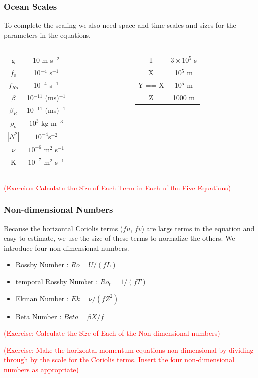 \documentclass[xcolor=dvipsnames]{beamer}
\begin{document}
\begin{frame}
\frametitle{Ocean Scales}

To complete the scaling we also need space and time scales and sizes for the parameters in the equations.\\ \vspace{0.2in}

\begin{columns}[c]
\column{2in}
\begin{tabular}{cc}
\hline
g & 10 m s$^{-2}$\\
$f_o$ & 10$^{-4}$ s$^{-1}$\\
$f_{Ro}$ & 10$^{-4}$ s$^{-1}$\\
$\beta$ &  10$^{-11}$ (ms)$^{-1}$\\
$\beta_R$ &  10$^{-11}$ (ms)$^{-1}$\\
$\rho_o$ & $10^3$ kg m$^{-3}$\\
$|N^2|$ & $10^{-4}$s$^{-2}$\\
$\nu$ & $10^{-6}$ m$^{2}$ s$^{-1}$\\
K & $10^{-7}$ m$^{2}$ s$^{-1}$\\
\hline
\end{tabular}
\column{2in}
\begin{tabular}{cc}
\hline
T & $3 \times 10^5$ s\\
X & 10$^5$ m\\
Y == X  & 10$^5$ m\\
Z & 1000 m\\
\hline
\end{tabular}
\end{columns}\vspace{0.2in}

\textcolor{red}{(Exercise: Calculate the Size of Each Term in Each of the Five Equations)}

\end{frame}

\begin{frame}
  \frametitle{Non-dimensional Numbers}   %
Because the horizontal Coriolis terms ($fu$, $fv$) are large terms in the equation and easy to estimate, we use the size of these terms to normalize the others.  We introduce four non-dimensional numbers. 
\begin{itemize}
\item Rossby Number : $Ro = U/(fL)$
\item temporal Rossby Number : $Ro_t = 1/(fT)$
\item Ekman Number : $Ek = \nu /(f Z^2)$
\item Beta Number : $Beta = \beta X / f$
\end{itemize}

  \textcolor{red}{(Exercise: Calculate the Size of Each of the Non-dimensional numbers)}

\textcolor{red}{(Exercise: Make the horizontal momentum equations non-dimensional by dividing through by the scale for the Coriolis terms.  Insert the four non-dimensional numbers as appropriate)}
\end{frame}
\end{document}
